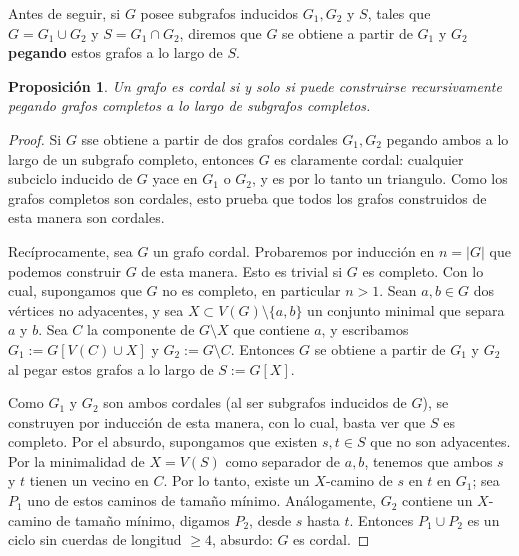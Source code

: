 \documentclass[12pt]{report}
\theoremstyle{plain}
\newtheorem{proposition}[theorem]{Proposición}
\theoremstyle{definition}
\newcommand{\abs}[1]{\left \vert #1 \right \vert}
\begin{document}
Antes de seguir, si $G$ posee subgrafos inducidos $G_1,G_2$ y $S$, tales que $G = G_1 \cup G_2$ y $S = G_1 \cap G_2$, diremos que $G$ se obtiene a partir de $G_1$ y $G_2$ \textbf{pegando} estos grafos a lo largo de $S$.

\begin{proposition}
Un grafo es cordal si y solo si puede construirse recursivamente pegando grafos completos a lo largo de subgrafos completos.
\end{proposition}
\begin{proof}
Si $G$ sse obtiene a partir de dos grafos cordales $G_1,G_2$ pegando ambos a lo largo de un subgrafo completo, entonces $G$ es claramente cordal: cualquier subciclo inducido de $G$ yace en $G_1$ o $G_2$, y es por lo tanto un triangulo. Como los grafos completos son cordales, esto prueba que todos los grafos construidos de esta manera son cordales.

Recíprocamente, sea $G$ un grafo cordal. Probaremos por inducción en $n = \abs G$ que podemos construir $G$ de esta manera. Esto es trivial si $G$ es completo. Con lo cual, supongamos que $G$ no es completo, en particular $n > 1$. Sean $a,b \in G$ dos vértices no adyacentes, y sea $X \subset V(G) \setminus \{a,b\}$ un conjunto minimal que separa $a$ y $b$. Sea $C$ la componente de $G \setminus X$ que contiene $a$, y escribamos $G_1 := G[V(C) \cup X]$ y $G_2 := G \setminus C$. Entonces $G$ se obtiene a partir de $G_1$ y $G_2$ al pegar estos grafos a lo largo de $S:= G[X]$.

Como $G_1$ y $G_2$ son ambos cordales (al ser subgrafos inducidos de $G$), se construyen por inducción de esta manera, con lo cual, basta ver que $S$ es completo. Por el absurdo, supongamos que existen $s,t \in S$ que no son adyacentes. Por la minimalidad de $X = V(S)$ como separador de $a,b$, tenemos que ambos $s$ y $t$ tienen un vecino en $C$. Por lo tanto, existe un $X$-camino de $s$ en $t$ en $G_1$; sea $P_1$ uno de estos caminos de tamaño mínimo. Análogamente, $G_2$ contiene un $X$-camino de tamaño mínimo, digamos $P_2$, desde $s$ hasta $t$. Entonces $P_1 \cup P_2$ es un ciclo sin cuerdas de longitud $\geq 4$, absurdo: $G$ es cordal.

\end{proof}
\end{document}
